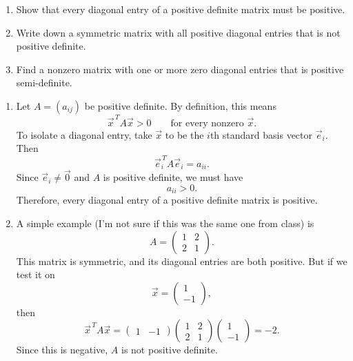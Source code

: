 \documentclass[10pt]{extarticle}
\begin{document}
\newpage

\begin{problem}[Problem 2]
\begin{enumerate}[label=(\alph*)]
\item Show that every diagonal entry of a positive definite matrix must be positive.
\item Write down a symmetric matrix with all positive diagonal entries that is not positive definite.
\item Find a nonzero matrix with one or more zero diagonal entries that is positive semi-definite.
\end{enumerate}
\end{problem}

\begin{enumerate}[label=(\alph*)]
\item Let $A=(a_{ij})$ be positive definite. By definition, this means
\[
\vec{x}^{\,T}A\vec{x}>0
\qquad \text{for every nonzero } \vec{x}.
\]
To isolate a diagonal entry, take $\vec{x}$ to be the $i$th standard basis vector $\vec{e}_i$. Then
\[
\vec{e}_i^{\,T}A\vec{e}_i=a_{ii}.
\]
Since $\vec{e}_i\neq \vec{0}$ and $A$ is positive definite, we must have
\[
a_{ii}>0.
\]
Therefore, every diagonal entry of a positive definite matrix is positive.

\item A simple example (I'm not sure if this was the same one from class) is
\[
A=
\begin{pmatrix}
1 & 2\\
2 & 1
\end{pmatrix}.
\]
This matrix is symmetric, and its diagonal entries are both positive. But if we test it on
\[
\vec{x}=
\begin{pmatrix}
1\\
-1
\end{pmatrix},
\]
then
\[
\vec{x}^{\,T}A\vec{x}
=
\begin{pmatrix}
1 & -1
\end{pmatrix}
\begin{pmatrix}
1 & 2\\
2 & 1
\end{pmatrix}
\begin{pmatrix}
1\\
-1
\end{pmatrix}
=-2.
\]
Since this is negative, $A$ is not positive definite.


\end{enumerate}
\end{document}
